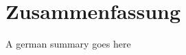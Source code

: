 \newpage
\chapter{Zusammenfassung}
\chaptermark{}
\renewcommand{\chaptermark}[1]{\markboth{#1}{}}
\renewcommand{\sectionmark}[1]{\markright{#1}}
\fancyhead[RE]{\small}
\fancyhead[LO]{\small\rightmark}

A german summary goes here

